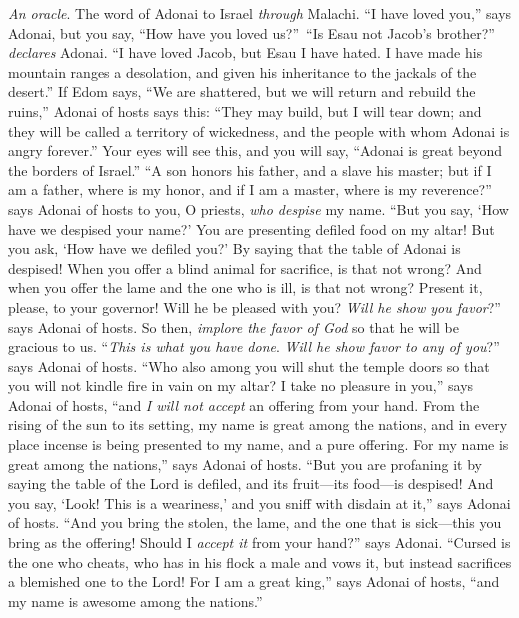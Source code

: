 
\begin{biblechapter} %
\verse \textit{An oracle}. The word of Adonai to Israel \textit{through} Malachi.
 “I have loved you,” says Adonai, but you say, “How have you loved us?” “Is Esau not Jacob’s brother?” \textit{declares} Adonai. “I have loved Jacob,
\verse but Esau I have hated. I have made his mountain ranges a desolation, and given his inheritance to the jackals of the desert.”
\verse If Edom says, “We are shattered, but we will return and rebuild the ruins,” Adonai of hosts says this: “They may build, but I will tear down; and they will be called a territory of wickedness, and the people with whom Adonai is angry forever.”
\verse Your eyes will see this, and you will say, “Adonai is great beyond the borders of Israel.”
 “A son honors his father, and a slave his master; but if I am a father, where is my honor, and if I am a master, where is my reverence?” says Adonai of hosts to you, O priests, \textit{who despise} my name. “But you say, ‘How have we despised your name?’
\verse You are presenting defiled food on my altar! But you ask, ‘How have we defiled you?’ By saying that the table of Adonai is despised!
\verse When you offer a blind animal for sacrifice, is that not wrong? And when you offer the lame and the one who is ill, is that not wrong? Present it, please, to your governor! Will he be pleased with you? \textit{Will he show you favor}?” says Adonai of hosts.
\verse So then, \textit{implore the favor of God} so that he will be gracious to us. “\textit{This is what you have done}. \textit{Will he show favor to any of you}?” says Adonai of hosts.
\verse “Who also among you will shut the temple doors so that you will not kindle fire in vain on my altar? I take no pleasure in you,” says Adonai of hosts, “and \textit{I will not accept} an offering from your hand.
\verse From the rising of the sun to its setting, my name is great among the nations, and in every place incense is being presented to my name, and a pure offering. For my name is great among the nations,” says Adonai of hosts.
\verse “But you are profaning it by saying the table of the Lord is defiled, and its fruit—its food—is despised!
\verse And you say, ‘Look! This is a weariness,’ and you sniff with disdain at it,” says Adonai of hosts. “And you bring the stolen, the lame, and the one that is sick—this you bring as the offering! Should I \textit{accept it} from your hand?” says Adonai.
\verse “Cursed is the one who cheats, who has in his flock a male and vows it, but instead sacrifices a blemished one to the Lord! For I am a great king,” says Adonai of hosts, “and my name is awesome among the nations.”
\end{biblechapter}

